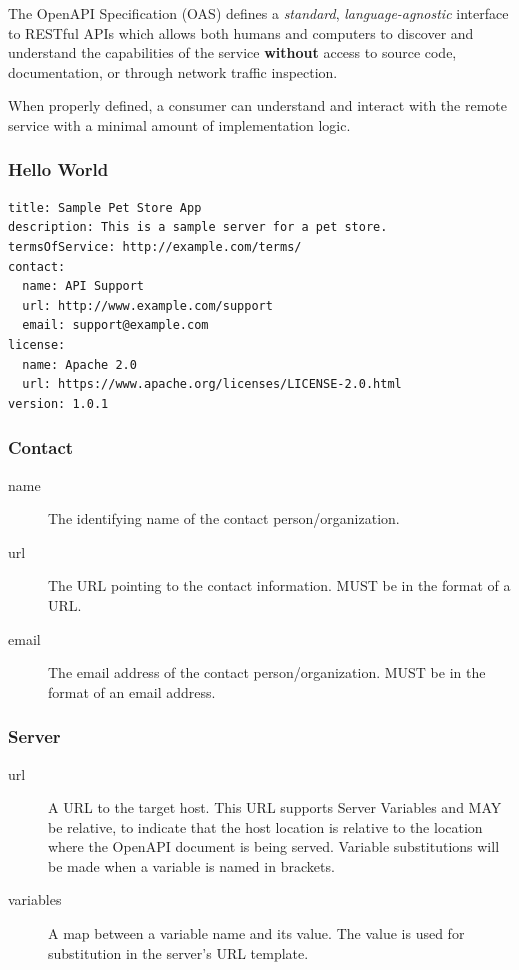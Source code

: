 \documentclass{efd-lecture}
\begin{document}
\begin{frame}
  \begin{block}{}
    The OpenAPI Specification (OAS) defines a \textit{\color{YellowOrange}standard},
    \textit{\color{LimeGreen}language-agnostic} interface
    to RESTful APIs which allows both humans and computers to discover and understand
    the capabilities of the service \textbf{\color{RubineRed}without} access to source code, documentation,
    or through network traffic inspection.
  \end{block}
  \begin{block}{}
    When properly defined, a consumer can understand and interact with the remote service
    with a minimal amount of implementation logic.
  \end{block}
\end{frame}

\begin{frame}[fragile]
  \frametitle{Hello World}
  \begin{verbatim}
title: Sample Pet Store App
description: This is a sample server for a pet store.
termsOfService: http://example.com/terms/
contact:
  name: API Support
  url: http://www.example.com/support
  email: support@example.com
license:
  name: Apache 2.0
  url: https://www.apache.org/licenses/LICENSE-2.0.html
version: 1.0.1
  \end{verbatim}
\end{frame}

\begin{frame}
  \frametitle{Contact}
  \begin{description}
    \item[name] The identifying name of the contact person/organization.
    \item[url] The URL pointing to the contact information. MUST be in the format of a URL\@.
    \item[email] The email address of the contact person/organization. MUST be in the format of an email address.
  \end{description}
\end{frame}

\begin{frame}
  \frametitle{Server}
  \begin{description}
    \item[url] A URL to the target host. This URL supports Server Variables and MAY be relative, to indicate that the host location is relative to the location where the OpenAPI document is being served.
      Variable substitutions will be made when a variable is named in {brackets}.
    \item[variables] A map between a variable name and its value. The value is used for substitution in the server's URL template.
  \end{description}
\end{frame}
\end{document}
